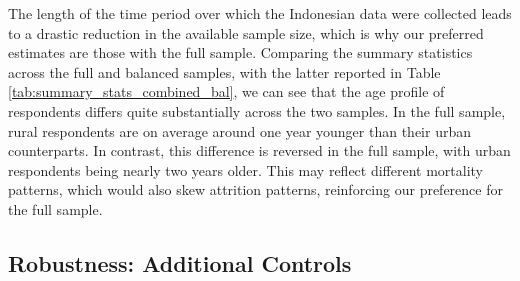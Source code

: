 \documentclass[12pt]{article}
\begin{document}
The length of the time period over which the Indonesian data were collected leads to a drastic reduction in the available sample size, which is why our preferred estimates are those with the full sample. 
Comparing the summary statistics across the full and balanced samples, with the latter reported in Table \ref{tab:summary_stats_combined_bal}, we can see that the age profile of respondents differs quite substantially across the two samples.
In the full sample, rural respondents are on average around one year younger than their urban counterparts. 
In contrast, this difference is reversed in the full sample, with urban respondents being nearly two years older. 
This may reflect different mortality patterns, which would also skew attrition patterns, reinforcing our preference for the full sample. 


\subsection{Robustness: Additional Controls}\label{subsec:robustness_controls}
\end{document}
